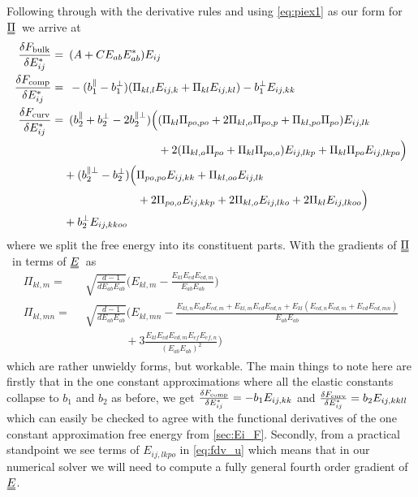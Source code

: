 \documentclass[12pt]{article}
\newcommand{\duf}[2]{\stackunder[0.5pt]{\stackunder[0.8pt]{\stackunder[1pt]{\ensuremath{#1}}{\rule{\widthof{\ensuremath{#2}}*\real{0.9}}{.1ex}}}{\rule{\widthof{\ensuremath{#2}}*\real{0.9}}{.1ex}}}{}}
\newcommand{\du}[1]{\duf{#1}{#1}}
\newcommand{\EE}{\ensuremath{\du{E}}}
\newcommand{\PP}{\ensuremath{\du{\Pi}}}
\begin{document}
        Following through with the derivative rules and using \cref{eq:piex1} as our form for \PP\ we arrive at
        \begin{align}
            \fdv{F_\text{bulk}}{E_{ij}^*} =&\enspace \qty(A + C E_{ab}E_{ab}^*)E_{ij} \label{eq:fdv_b} \\
            \fdv{F_\text{comp}}{E_{ij}^*} =&\enspace -(b_1^\parallel - b_1^\perp) (\Pi_{kl,l} E_{ij,k} + \Pi_{kl} E_{ij,kl}) - b_1^\perp E_{ij,kk} \label{eq:fdv_c} \\
            \fdv{F_\text{curv}}{E_{ij}^*} =&\enspace (b_2^\parallel + b_2^\perp - 2b_2^{\parallel\perp}) \Bigl( (\Pi_{kl}\Pi_{po,po} + 2\Pi_{kl,o}\Pi_{po,p} + \Pi_{kl,po}\Pi_{po})E_{ij,lk} \label{eq:fdv_u} \\
            &\phantom{\enspace (b_2^\parallel + b_2^\perp - 2b_2^{\parallel\perp}) \Bigl(}+ 2(\Pi_{kl,o}\Pi_{po} + \Pi_{kl}\Pi_{po,o})E_{ij,lkp} + \Pi_{kl}\Pi_{po}E_{ij,lkpo} \Bigr) \nonumber \\
            &+ (b_2^{\parallel\perp} - b_2^\perp)\Bigl( \Pi_{po,po}E_{ij,kk} + \Pi_{kl,oo}E_{ij,lk} \nonumber \\ 
            &\phantom{\enspace+ (b_2^{\parallel\perp} - b_2^\perp)\Bigl(}+ 2\Pi_{po,o}E_{ij,kkp} + 2\Pi_{kl,o}E_{ij,lko} + 2\Pi_{kl}E_{ij,lkoo} \Bigr) \nonumber \\ 
            &+ b_2^\perp E_{ij,kkoo} \nonumber
        \end{align}
        where we split the free energy into its constituent parts.
        With the gradients of \PP\ in terms of \EE\ as
        \begin{align}
            \Pi_{kl,m} =&\enspace \sqrt{\frac{d-1}{dE_{ab}E_{ab}}} \biggl(E_{kl,m} - \frac{E_{kl}E_{cd}E_{cd,m}}{E_{ab}E_{ab}}\biggr) \label{eq:pig1} \\
            \Pi_{kl,mn} =&\enspace \sqrt{\frac{d-1}{dE_{ab}E_{ab}}} \biggl(E_{kl,mn} - \frac{E_{kl,n}E_{cd}E_{cd,m} + E_{kl,m}E_{cd}E_{cd,n} + E_{kl}(E_{cd,n}E_{cd,m} + E_{cd}E_{cd,mn})}{E_{ab}E_{ab}} \label{eq:pig2} \\
            &\phantom{\sqrt{\frac{d-1}{dE_{ab}E_{ab}}} \Biggl(} + 3\frac{E_{kl}E_{cd}E_{cd,m}E_{ef}E_{ef,n}}{(E_{ab}E_{ab})^2} \biggr) \nonumber
        \end{align}
        which are rather unwieldy forms, but workable.
        The main things to note here are firstly that in the one constant approximations where all the elastic constants collapse to $b_1$ and $b_2$ as before, we get $\fdv{F_\text{comp}}{E_{ij}^*} = -b_1 E_{ij,kk}$ and $\fdv{F_\text{curv}}{E_{ij}^*} = b_2 E_{ij,kkll}$ which can easily be checked to agree with the functional derivatives of the one constant approximation free energy from \cref{sec:Ei_F}.
        Secondly, from a practical standpoint we see terms of $E_{ij,lkpo}$ in \cref{eq:fdv_u} which means that in our numerical solver we will need to compute a fully general fourth order gradient of \EE.
\end{document}

